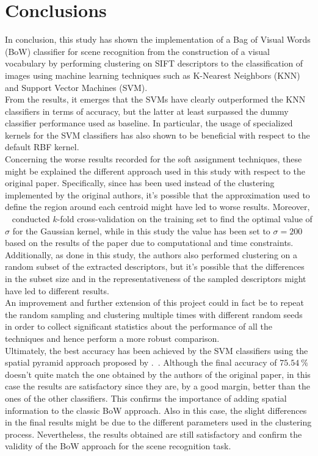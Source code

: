 \documentclass[../main.tex]{subfiles}
\begin{document}
\section{Conclusions}\label{sec:conclusions}

In conclusion, this study has shown the implementation of a Bag of Visual Words
(BoW) classifier for scene recognition from the construction of a visual
vocabulary by performing clustering on SIFT descriptors to the classification of
images using machine learning techniques such as K-Nearest Neighbors (KNN) and Support Vector Machines (SVM).\\
From the results, it emerges that the SVMs have clearly outperformed the KNN
classifiers in terms of accuracy, but the latter at least surpassed the dummy
classifier performance used as baseline. In particular, the usage of specialized
kernels for the SVM classifiers has also shown to be beneficial with respect to the default RBF kernel.\\
Concerning the worse results recorded for the soft assignment techniques, these
might be explained the different approach used in this study with respect to the
original paper. Specifically, since  has been
used instead of the  clustering implemented by the original
authors, it's possible that the approximation used to define the region around
each centroid might have led to worse results.
Moreover, ~\cite{gemert} conducted $k$-fold
cross-validation on the training set to find the optimal value of $\sigma$
for the Gaussian kernel,
while in this study the value has been set to $\sigma = 200$ based on the
results of the paper due to computational and time constraints. Additionally, as
done in this study,
the authors also performed clustering on a random subset of the extracted
descriptors, but it's possible that the differences in the subset size and in
the
representativeness of the sampled descriptors might have led to different
results.\\
An improvement and further extension of this project could in fact be to repeat
the random sampling and clustering multiple times with different random seeds in order to collect significant statistics
about the performance of all the techniques and hence perform a more robust
comparison.\\
Ultimately, the best accuracy has been achieved by the SVM classifiers using the
spatial pyramid approach proposed by .~\cite{lazebnik}.
Although the final accuracy of $\SI{75.54}{\percent}$ doesn't quite match the
one obtained by the authors of the original paper, in this case the results are
satisfactory since they are, by a good margin, better than the ones of the other
classifiers. This confirms the importance of adding spatial
information to the classic BoW approach. Also in this case, the slight
differences in the final results might be due to the different parameters used
in the clustering process.
Nevertheless, the results obtained are still satisfactory and confirm the validity of the BoW approach for the scene recognition task.
\end{document}
